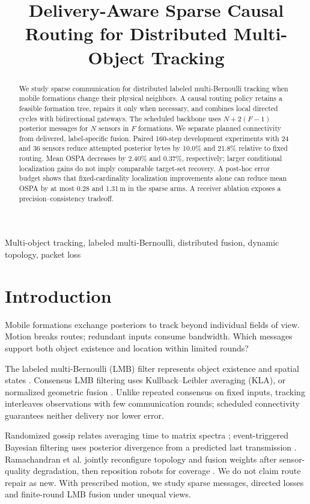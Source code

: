 \documentclass{article}
\title{Delivery-Aware Sparse Causal Routing for Distributed Multi-Object Tracking}
\begin{document}
\maketitle
\begin{abstract}
We study sparse communication for distributed labeled multi-Bernoulli tracking
when mobile formations change their physical neighbors. A causal routing
policy retains a feasible formation tree, repairs it only when necessary, and
combines local directed cycles with bidirectional gateways. The scheduled
backbone uses $N+2(F-1)$ posterior messages for $N$ sensors in $F$ formations.
We separate planned connectivity from delivered, label-specific fusion.
Paired 160-step development experiments with 24 and 36 sensors reduce
attempted posterior bytes by 10.0\% and 21.8\% relative to fixed routing.
Mean OSPA decreases by 2.40\% and 0.37\%, respectively; larger conditional
localization gains do not imply comparable target-set recovery. A post-hoc
error budget shows that fixed-cardinality localization improvements alone
can reduce mean OSPA by at most 0.28 and 1.31\,m in the sparse arms.
A receiver ablation exposes a precision--consistency tradeoff.
\end{abstract}
\begin{keywords}
Multi-object tracking, labeled multi-Bernoulli, distributed fusion, dynamic
topology, packet loss
\end{keywords}

\section{Introduction}
Mobile formations exchange posteriors to track beyond individual fields of
view. Motion breaks routes; redundant inputs consume bandwidth. Which
messages support both object existence and location within limited rounds?

The labeled multi-Bernoulli (LMB) filter represents object existence and
spatial states \cite{reuter2014lmb}. Consensus LMB filtering uses
Kullback--Leibler averaging (KLA), or normalized geometric fusion
\cite{battistelli2014kla,fantacci2015consensus}. Unlike repeated consensus
on fixed inputs, tracking interleaves observations with few communication
rounds; scheduled connectivity guarantees neither delivery nor lower error.

Randomized gossip relates averaging time to matrix spectra
\cite{boyd2006gossip}; event-triggered Bayesian filtering uses posterior
divergence from a predicted last transmission \cite{battistelli2019event}.
Ramachandran et al. jointly reconfigure topology and fusion weights after
sensor-quality degradation, then reposition robots for coverage
\cite{ramachandran2021reconfiguration}. We do not claim route repair as new.
With prescribed motion, we study sparse messages, directed losses and
finite-round LMB fusion under unequal views.
\end{document}
